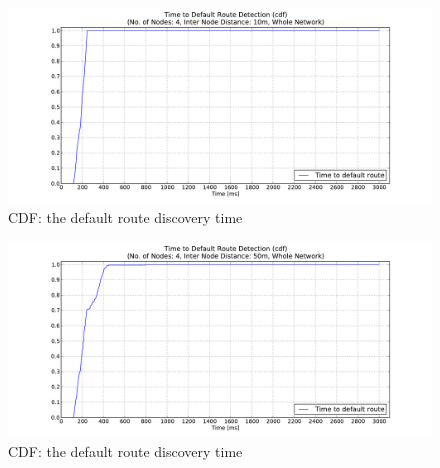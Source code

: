 \begin{figure}[htbp]
  \begin{center}
    \leavevmode
      \includegraphics[width=\textwidth]
      {Pics/results/4/MRHOF/line/dist10_montecarlo_cdf_hist.pdf}
   \caption{CDF: the default route discovery time}
    \label{fig:dist10_montecarlo_cdf_hist}
  \end{center}
\end{figure}

\begin{figure}[htbp]
  \begin{center}
    \leavevmode
      \includegraphics[width=\textwidth]
      {Pics/results/4/MRHOF/line/dist50_montecarlo_cdf_hist.pdf}
   \caption{CDF: the default route discovery time}
    \label{fig:dist50_montecarlo_cdf_hist}
  \end{center}
\end{figure}
  

